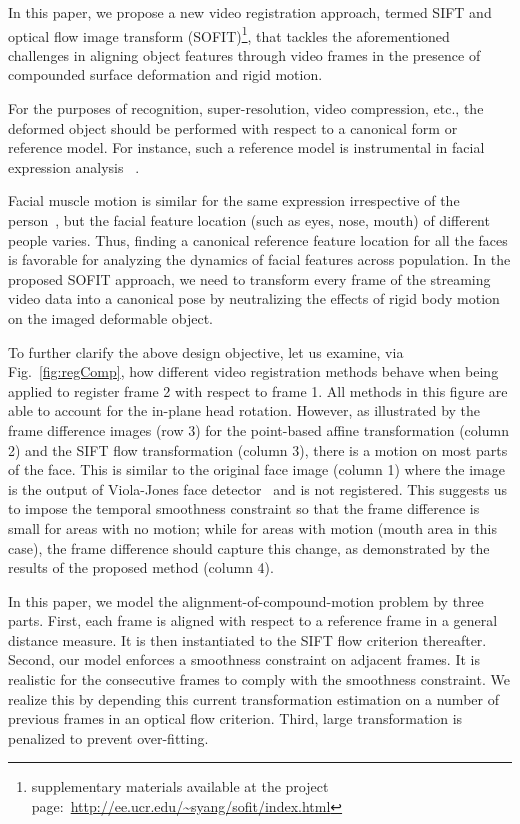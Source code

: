 \documentclass[10pt,journal]{IEEEtran}
\begin{document}
In this paper, we propose a new video registration approach, termed SIFT and optical flow image transform (SOFIT)\footnote{supplementary materials available at the project page:~\url{http://ee.ucr.edu/~syang/sofit/index.html}}, that tackles the aforementioned challenges in \textcolor[rgb]{1,0,0}{aligning object features through video frames in the presence of compounded surface deformation and rigid motion.}

\textcolor[rgb]{1,0,0}{
For the purposes of recognition, super-resolution, video compression, etc., the deformed object should be performed with respect to a canonical form or reference model.
For instance, such a reference model is instrumental in facial expression analysis ~\cite{Yang_SMCB12}.
}

Facial muscle motion is similar for the same expression irrespective of the person~\cite{Ekman78}, but the facial feature location (such as eyes, nose, mouth) of different people varies. Thus, finding a canonical reference feature location for all the faces is favorable for analyzing the dynamics of facial features across population. \textcolor[rgb]{1,0,0}{In the proposed SOFIT approach, we need to transform every frame of the streaming video data into a canonical pose by neutralizing the effects of rigid body motion on the imaged deformable object.}

\textcolor[rgb]{1,0,0}{To further clarify the above design objective, let us examine, via Fig.~\ref{fig:regComp}, how different video registration methods behave when being applied to register frame 2 with respect to frame 1.  All methods in this figure are able to account for the in-plane head rotation. However, as illustrated by the frame difference images (row 3) for the point-based affine transformation (column 2) and the SIFT flow transformation (column 3), there is a motion on most parts of the face. This is similar to the original face image (column 1) where the image is the output of Viola-Jones face detector~\cite{Viola_IJCV04} and is not registered. This suggests us to impose the temporal smoothness constraint so that the frame difference is small for areas with no motion; while for areas with motion (mouth area in this case), the frame difference should capture this change, as demonstrated by the results of the proposed method (column 4).}

In this paper, we model the alignment-of-compound-motion problem by three parts. First, each frame is aligned with respect to a reference frame in a general distance measure. It is then instantiated to the SIFT flow criterion thereafter. Second, our model enforces a smoothness constraint on adjacent frames. It is realistic for the consecutive frames to comply with the smoothness constraint. We realize this by depending this current transformation estimation on a number of previous frames in an optical flow criterion. Third, large transformation is penalized to prevent over-fitting. 
\end{document}
